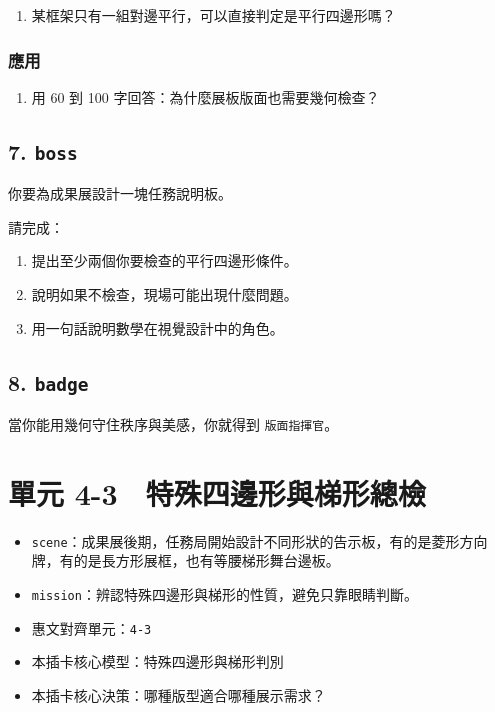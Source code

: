 \documentclass[
  chinese,
  12pt,
  a4paper,
  oneside]{article}
\providecommand{\tightlist}{%
  \setlength{\itemsep}{0pt}\setlength{\parskip}{0pt}}
\begin{document}
\begin{enumerate}
\def\labelenumi{\arabic{enumi}.}
\setcounter{enumi}{3}
\tightlist
\item
  某框架只有一組對邊平行，可以直接判定是平行四邊形嗎？
\end{enumerate}

\subsubsection{應用}\label{ux61c9ux7528-4}

\begin{enumerate}
\def\labelenumi{\arabic{enumi}.}
\setcounter{enumi}{4}
\tightlist
\item
  用 60 到 100 字回答：為什麼展板版面也需要幾何檢查？
\end{enumerate}

\subsection{\texorpdfstring{7. \texttt{boss}}{7. boss}}\label{boss-4}

你要為成果展設計一塊任務說明板。

請完成：

\begin{enumerate}
\def\labelenumi{\arabic{enumi}.}
\tightlist
\item
  提出至少兩個你要檢查的平行四邊形條件。
\item
  說明如果不檢查，現場可能出現什麼問題。
\item
  用一句話說明數學在視覺設計中的角色。
\end{enumerate}

\subsection{\texorpdfstring{8. \texttt{badge}}{8. badge}}\label{badge-4}

當你能用幾何守住秩序與美感，你就得到 \texttt{版面指揮官}。

\newpage

\section{單元
4-3　特殊四邊形與梯形總檢}\label{ux55aeux5143-4-3-ux7279ux6b8aux56dbux908aux5f62ux8207ux68afux5f62ux7e3dux6aa2}

\begin{itemize}
\tightlist
\item
  \texttt{scene}：成果展後期，任務局開始設計不同形狀的告示板，有的是菱形方向牌，有的是長方形展框，也有等腰梯形舞台邊板。
\item
  \texttt{mission}：辨認特殊四邊形與梯形的性質，避免只靠眼睛判斷。
\item
  惠文對齊單元：\texttt{4-3}
\item
  本插卡核心模型：特殊四邊形與梯形判別
\item
  本插卡核心決策：哪種版型適合哪種展示需求？
\end{itemize}
\end{document}
